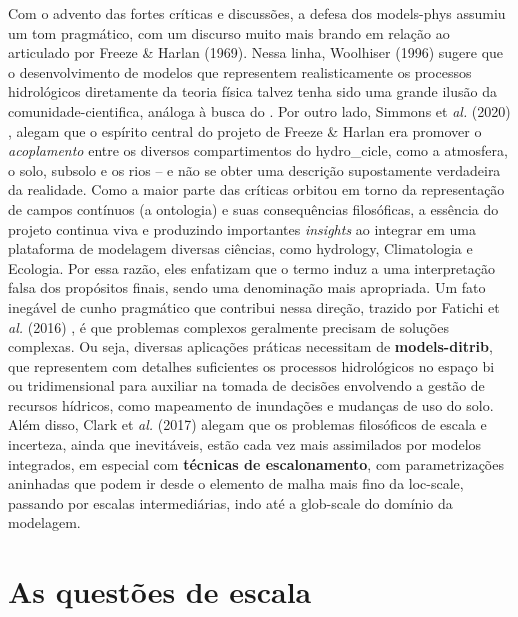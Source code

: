 \documentclass[./main.tex]{subfiles}
\begin{document}
\par Com o advento das fortes críticas e discussões, a defesa dos \gls{models-phys} assumiu um tom pragmático, com um discurso muito mais brando em relação ao articulado por Freeze \& Harlan (1969). Nessa linha, Woolhiser (1996) \cite{Woolhiser1996a} sugere que o desenvolvimento de modelos que representem realisticamente os processos hidrológicos diretamente da \gls{teoria} física talvez tenha sido uma grande ilusão da \gls{comunidade-cientifica}, análoga à busca do . Por outro lado, Simmons et \textit{al.} (2020) \cite{Simmons2020a}, alegam que o espírito central do projeto de Freeze \& Harlan era promover o \textit{acoplamento} entre os diversos compartimentos do \gls{hydro_cicle}, como a atmosfera, o solo, subsolo e os rios -- e não se obter uma descrição supostamente verdadeira da realidade. Como a maior parte das críticas orbitou em torno da representação de campos contínuos (a ontologia) e suas consequências filosóficas, a essência do projeto continua viva e produzindo importantes \textit{insights} ao integrar em uma plataforma de modelagem diversas ciências, como \gls{hydrology}, Climatologia e Ecologia. Por essa razão, eles enfatizam que o termo  induz a uma interpretação falsa dos propósitos finais, sendo  uma denominação mais apropriada. Um fato inegável de cunho pragmático que contribui nessa direção, trazido por Fatichi et \textit{al.} (2016) \cite{Fatichi2016a}, é que problemas complexos geralmente precisam de soluções complexas. Ou seja, diversas aplicações práticas necessitam de \textbf{\gls{models-ditrib}}, que representem com detalhes suficientes os processos hidrológicos no espaço bi ou tridimensional para auxiliar na tomada de decisões envolvendo a gestão de recursos hídricos, como mapeamento de inundações e mudanças de uso do solo. Além disso, Clark et \textit{al.} (2017) \cite{Clark2017a} alegam que os problemas filosóficos de escala e incerteza, ainda que inevitáveis, estão cada vez mais assimilados por modelos integrados, em especial com \textbf{técnicas de escalonamento}, com parametrizações aninhadas que podem ir desde o elemento de malha mais fino da \gls{loc-scale}, passando por escalas intermediárias, indo até a \gls{glob-scale} do domínio da modelagem.
 
\section{As questões de escala} \label{sec:hydro:sim}
\end{document}
